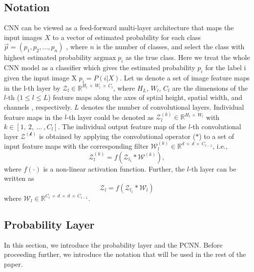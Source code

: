\documentclass[pageno]{jpaper}
\begin{document}
\subsection{Notation}
CNN can be viewed as a feed-forward multi-layer architecture that maps the input images $X$ to a vector of estimated probability for each class $\vec{p} = (p_1, p_2, ..., p_n)$
, where $n$ is the number of classes, and select the class with highest estimated probability 
${\text{argmax}} \; p_i$
as the true class. Here we treat the whole CNN model as a classifier which gives the estimated probability $p_i$ for the label i given the input image X
$p_i = P(i|X)$. 
Let us denote a set of image feature maps in the l-th layer by $\mathcal{Z}_l \in \mathbb{R}^{H_l \: \times \: W_l \: \times \: C_l}$, where $H_L$, $W_l$, $C_l$ are the dimensions of the $l$-th ($1 \leqslant l \leqslant L$) feature maps along the axes of sptial height, spatial width, and channels , respectively. $L$ denotes the number of convolutional layers. Individual feature maps in the $l$-th layer could be denoted as $\mathcal{Z}_l^{(k)} \in \mathbb{R}^{H_l \: \times \: W_l}$ with $k \in [1, \:2, \: \dots \:, C_l]$. The individual output feature map of the $l$-th convolutional layer $\mathcal{Z^{(k)}}$ is obtained by applying the convolutional operator ($\ast$) to a set of input feature maps with the corresponding filter $\mathcal{W}_l^{(k)} \in \mathbb{R}^{d \: \times \: d \: \times \: C_{l-1}}$, i.e.,
\begin{equation}
    \mathcal{Z}_l^{(k)} = f(\mathcal{Z}_{l_1} \ast \mathcal{W}^{(k)}),
\end{equation}
where $f(\cdot)$ is a non-linear activation function. Further, the $l$-th layer can be written as
\begin{equation} \label{eq:1}
    \mathcal{Z}_l = f(\mathcal{Z}_{l_1} \ast \mathcal{W}_l)
\end{equation}
where $\mathcal{W}_l \in \mathbb{R}^{C_l \: \times \:   d \: \times \: d \: \times \: C_{l-1}}$.



\subsection{Probability Layer}
In this section, we introduce the probability layer and the PCNN. Before proceeding further, we introduce the notation that will be used in the rest of the paper.
\end{document}

